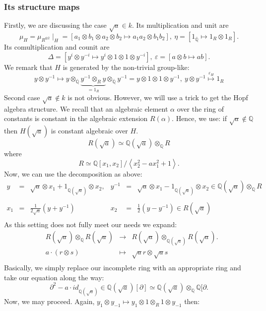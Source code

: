 \documentclass[10pt,a4paper]{article}
\newcommand{\eps}{\varepsilon}
\newcommand{\qz}{{\mathbb{Q}}}
\newcommand{\qzcl}{\overline{\qz}}
\begin{document}
\subsubsection{Its structure maps}
Firstly, we are discussing the case $\sqrt{a} \in k$. Its multiplication and unit are
$$\mu_H = \mu_{R^{\otimes2}} \mid_H = [a_1 \otimes b_1 \otimes a_2 \otimes b_2 \longmapsto a_1 a_2 \otimes b_1 b_2],\ \eta = [1_{\qzcl} \longmapsto 1_R \otimes 1_{R}].$$
Its comultiplication and counit are
$$\Delta = [y^i \otimes y^{-i} \longmapsto y^i \otimes 1 \otimes 1 \otimes y^{-i}],\ \eps = [a \otimes b \longmapsto a b].$$
We remark that $H$ is generated by the non-trivial group-like:
$$y \otimes y^{-1} \longmapsto y \otimes_{\qzcl} \underbrace{y^{-1} \otimes_R y}_{= 1_R} \otimes_{\qzcl} y^{-1} = y \otimes 1 \otimes 1 \otimes y^{-1},\ y\otimes y^{-1} \stackrel{\eps_H}{\longmapsto} 1_R$$
Second case $\sqrt{a} \notin k$ is not obvious. However, we will use a trick to get the Hopf algebra structure. We recall that an algebraic element $\alpha$ over the ring of constants is constant in the algebraic extension $R(\alpha)$. Hence, we use: if $\sqrt{a} \notin \qz$ then $H(\sqrt{a})$ is constant algebraic over $H$.
\newcommand{\pvextens}{R(\sqrt{a})}
$$\pvextens \simeq \qz(\sqrt{a}) \otimes_\qz R$$
where
$$R \simeq \qz[x_1,x_2]/\left<x_2^2 - a x_1^2 + 1\right>.$$
Now, we can use the decomposition as above:
$$\begin{array}{rclrcl}
y &=& \sqrt{a} \otimes x_1 + 1_{\qz(\sqrt{a})} \otimes x_2,&y^{-1} &=& \sqrt{a} \otimes x_1 - 1_{\qz(\sqrt{a})} \otimes x_2 \in \qz(\sqrt{a}) \otimes_\qz R\\
&&&&&\\
x_1 &=& \frac{1}{2 \sqrt{a}} (y + y^{-1}) &
x_2 &=& \frac{1}{2} (y - y^{-1}) \in \pvextens\\
\end{array}$$
As this setting does not fully meet our needs we expand:
$$\begin{array}{rrcl}
&\pvextens \otimes_\qz \pvextens &\longrightarrow& \pvextens \otimes_{\qz(\sqrt{a})} \pvextens.\\
&a \cdot (r \otimes s)& \longmapsto&\sqrt{a} r \otimes  \sqrt{a} s\\
\end{array}$$
Basically, we simply replace our incomplete ring with an appropriate ring and take our equation along the way:
$$\partial^2 - a \cdot id_{\qz(\sqrt{a})} \in \qz(\sqrt{a})[\partial] \simeq \qz(\sqrt{a}) \otimes_\qz \qz[\partial.$$ 
Now, we may proceed. Again, $y_1 \otimes y_{-1} \longmapsto y_1 \otimes 1 \otimes_R 1 \otimes y_{-1}$ then:
\end{document}
